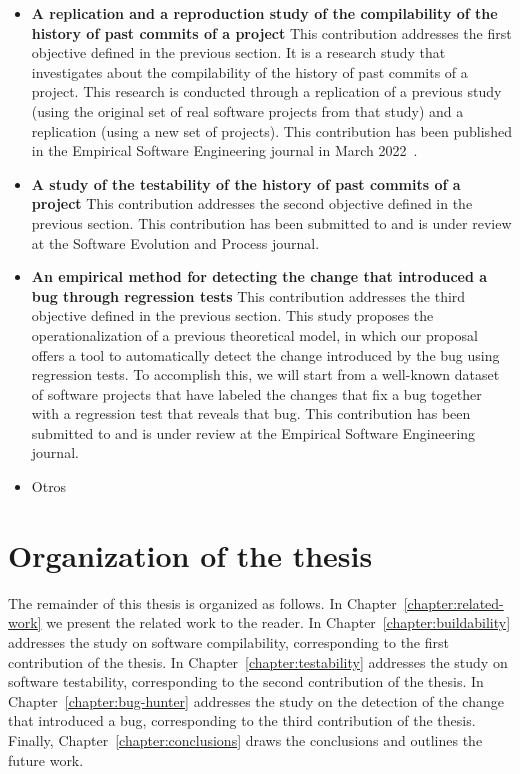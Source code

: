\begin{itemize}
    \item \textbf{A replication and a reproduction study of the compilability of the history of past commits of a project}
    This contribution addresses the first objective defined in the previous section.
    It is a research study that investigates about the compilability of the history of past commits of a project.
    This research is conducted through a replication of a previous study~\cite{tufano2017there} (using the original set of real software projects from that study) and a replication (using a new set of projects).
    This contribution has been published in the Empirical Software Engineering journal in March 2022~\cite{maes2022revisiting}.
    \item \textbf{A study of the testability of the history of past commits of a project}
    This contribution addresses the second objective defined in the previous section.
    This contribution has been submitted to and is under review at the Software Evolution and Process journal.
    \item \textbf{An empirical method for detecting the change that introduced a bug through regression tests}
    This contribution addresses the third objective defined in the previous section. 
    This study proposes the operationalization of a previous theoretical model, in which our proposal offers a tool to automatically detect the change introduced by the bug using regression tests. To accomplish this, we will start from a well-known dataset of software projects that have labeled the changes that fix a bug together with a regression test that reveals that bug.
    This contribution has been submitted to and is under review at the Empirical Software Engineering journal.
    \item{Otros} 
\end{itemize}

\section{Organization of the thesis}

The remainder of this thesis is organized as follows.
In Chapter~\ref{chapter:related-work} we present the related work to the reader. 
In Chapter~\ref{chapter:buildability} addresses the study on software compilability, corresponding to the first contribution of the thesis.
In Chapter~\ref{chapter:testability} addresses the study on software testability, corresponding to the second contribution of the thesis.
In Chapter~\ref{chapter:bug-hunter} addresses the study on the detection of the change that introduced a bug, corresponding to the third contribution of the thesis.
Finally, Chapter~\ref{chapter:conclusions} draws the conclusions and outlines the future work.

